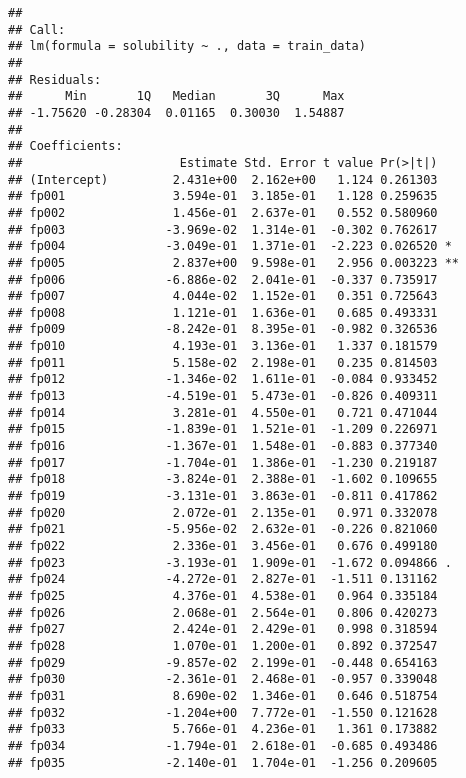 \documentclass[]{article}
\begin{document}
\begin{verbatim}
## 
## Call:
## lm(formula = solubility ~ ., data = train_data)
## 
## Residuals:
##      Min       1Q   Median       3Q      Max 
## -1.75620 -0.28304  0.01165  0.30030  1.54887 
## 
## Coefficients:
##                      Estimate Std. Error t value Pr(>|t|)    
## (Intercept)         2.431e+00  2.162e+00   1.124 0.261303    
## fp001               3.594e-01  3.185e-01   1.128 0.259635    
## fp002               1.456e-01  2.637e-01   0.552 0.580960    
## fp003              -3.969e-02  1.314e-01  -0.302 0.762617    
## fp004              -3.049e-01  1.371e-01  -2.223 0.026520 *  
## fp005               2.837e+00  9.598e-01   2.956 0.003223 ** 
## fp006              -6.886e-02  2.041e-01  -0.337 0.735917    
## fp007               4.044e-02  1.152e-01   0.351 0.725643    
## fp008               1.121e-01  1.636e-01   0.685 0.493331    
## fp009              -8.242e-01  8.395e-01  -0.982 0.326536    
## fp010               4.193e-01  3.136e-01   1.337 0.181579    
## fp011               5.158e-02  2.198e-01   0.235 0.814503    
## fp012              -1.346e-02  1.611e-01  -0.084 0.933452    
## fp013              -4.519e-01  5.473e-01  -0.826 0.409311    
## fp014               3.281e-01  4.550e-01   0.721 0.471044    
## fp015              -1.839e-01  1.521e-01  -1.209 0.226971    
## fp016              -1.367e-01  1.548e-01  -0.883 0.377340    
## fp017              -1.704e-01  1.386e-01  -1.230 0.219187    
## fp018              -3.824e-01  2.388e-01  -1.602 0.109655    
## fp019              -3.131e-01  3.863e-01  -0.811 0.417862    
## fp020               2.072e-01  2.135e-01   0.971 0.332078    
## fp021              -5.956e-02  2.632e-01  -0.226 0.821060    
## fp022               2.336e-01  3.456e-01   0.676 0.499180    
## fp023              -3.193e-01  1.909e-01  -1.672 0.094866 .  
## fp024              -4.272e-01  2.827e-01  -1.511 0.131162    
## fp025               4.376e-01  4.538e-01   0.964 0.335184    
## fp026               2.068e-01  2.564e-01   0.806 0.420273    
## fp027               2.424e-01  2.429e-01   0.998 0.318594    
## fp028               1.070e-01  1.200e-01   0.892 0.372547    
## fp029              -9.857e-02  2.199e-01  -0.448 0.654163    
## fp030              -2.361e-01  2.468e-01  -0.957 0.339048    
## fp031               8.690e-02  1.346e-01   0.646 0.518754    
## fp032              -1.204e+00  7.772e-01  -1.550 0.121628    
## fp033               5.766e-01  4.236e-01   1.361 0.173882    
## fp034              -1.794e-01  2.618e-01  -0.685 0.493486    
## fp035              -2.140e-01  1.704e-01  -1.256 0.209605    

\end{verbatim}
\end{document}
